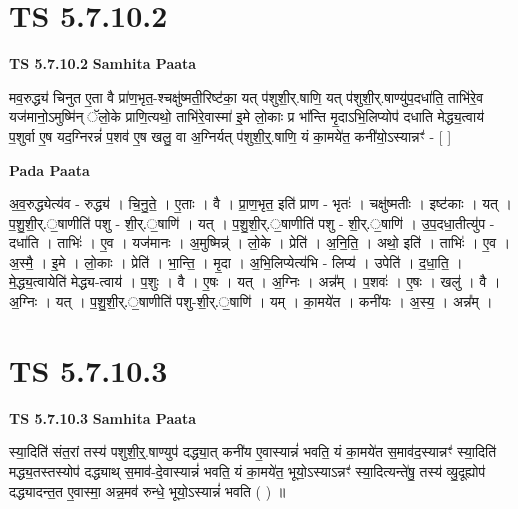 \documentclass[17pt]{extarticle}
\begin{document}
\section*{ TS 5.7.10.2 }

\textbf{TS 5.7.10.2 } \newline
\textbf{Samhita Paata} \newline

मव॒रुद्ध्य॑ चिनुत ए॒ता वै प्रा॑ण॒भृत॒-श्चक्षु॑ष्मती॒रिष्ट॑का॒ यत् प॑शुशी॒र्.षाणि॒ यत् प॑शुशी॒र्.षाण्यु॑प॒दधा॑ति॒ ताभि॑रे॒व यज॑मानो॒ऽमुष्मि॑न् ॅलो॒के प्राणि॒त्यथो॒ ताभि॑रे॒वास्मा॑ इ॒मे लो॒काः प्र भा᳚न्ति मृ॒दाऽभि॒लिप्योप॑ दधाति मेद्ध्य॒त्वाय॑ प॒शुर्वा ए॒ष यद॒ग्निरन्नं॑ प॒शव॑ ए॒ष खलु॒ वा अ॒ग्निर्यत् प॑शुशी॒र्॒.षाणि॒ यं का॒मये॑त॒ कनी॑यो॒ऽस्यान्नꣳ॑ - [  ] \newline

\textbf{Pada Paata} \newline

अ॒व॒रुद्ध्येत्य॑व - रुद्ध्य॑ । चि॒नु॒ते॒ । ए॒ताः । वै । प्रा॒ण॒भृत॒ इति॑ प्राण - भृतः॑ । चक्षु॑ष्मतीः । इष्ट॑काः । यत् । प॒शु॒शी॒र्.॒षाणीति॑ पशु - शी॒र्.॒षाणि॑ । यत् । प॒शु॒शी॒र्.॒षाणीति॑ पशु - शी॒र्.॒षाणि॑ । उ॒प॒दधा॒तीत्यु॑प - दधा॑ति । ताभिः॑ । ए॒व । यज॑मानः । अ॒मुष्मिन्न्॑ । लो॒के । प्रेति॑ । अ॒नि॒ति॒ । अथो॒ इति॑ । ताभिः॑ । ए॒व । अ॒स्मै॒ । इ॒मे । लो॒काः । प्रेति॑ । भा॒न्ति॒ । मृ॒दा । अ॒भि॒लिप्येत्य॑भि - लिप्य॑ । उपेति॑ । द॒धा॒ति॒ । मे॒द्ध्य॒त्वायेति॑ मेद्ध्य-त्वाय॑ । प॒शुः । वै । ए॒षः । यत् । अ॒ग्निः । अन्न᳚म् । प॒शवः॑ । ए॒षः । खलु॑ । वै । अ॒ग्निः । यत् । प॒शु॒शी॒र्.॒षाणीति॑ पशु-शी॒र्.॒षाणि॑ । यम् । का॒मये॑त । कनी॑यः । अ॒स्य॒ । अन्न᳚म् ।  \newline




\section*{ TS 5.7.10.3 }

\textbf{TS 5.7.10.3 } \newline
\textbf{Samhita Paata} \newline

स्या॒दिति॑ संत॒रां तस्य॑ पशुशी॒र्॒.षाण्युप॑ दद्ध्या॒त् कनी॑य ए॒वास्यान्नं॑ भवति॒ यं का॒मये॑त स॒माव॑द॒स्यान्नꣳ॑ स्या॒दिति॑ मद्ध्य॒तस्तस्योप॑ दद्ध्याथ् स॒माव॑-दे॒वास्यान्नं॑ भवति॒ यं का॒मये॑त॒ भूयो॒ऽस्याऽन्नꣳ॑ स्या॒दित्यन्ते॑षु॒ तस्य॑ व्यु॒दूह्योप॑ दद्ध्यादन्त॒त ए॒वास्मा॒ अन्न॒मव॑ रुन्धे॒ भूयो॒ऽस्यान्नं॑ भवति ( ) ॥ \newline
\end{document}
